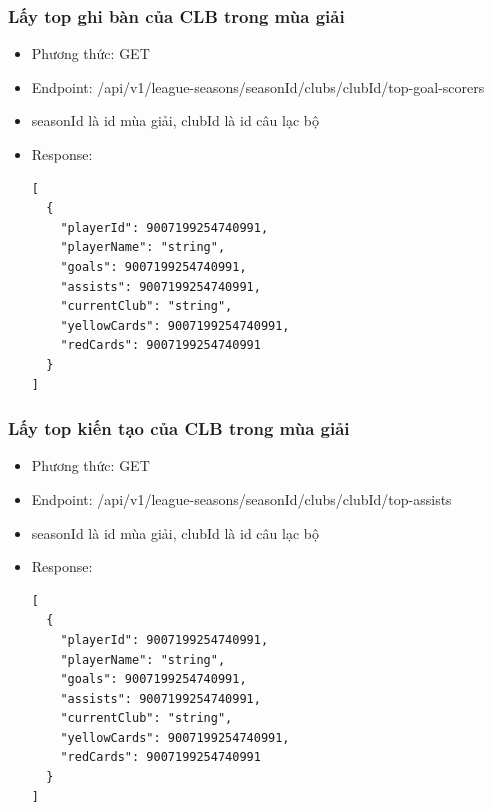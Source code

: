 \documentclass[../BTL.tex]{subfiles}
\begin{document}
\subsubsection{ Lấy top ghi bàn của CLB trong mùa giải}
\begin{itemize}
    \item Phương thức: GET
    \item Endpoint: /api/v1/league-seasons/{seasonId}/clubs/{clubId}/top-goal-scorers
    \item {seasonId} là id mùa giải, {clubId} là id câu lạc bộ
    \item Response:
        \begin{verbatim}
[
  {
    "playerId": 9007199254740991,
    "playerName": "string",
    "goals": 9007199254740991,
    "assists": 9007199254740991,
    "currentClub": "string",
    "yellowCards": 9007199254740991,
    "redCards": 9007199254740991
  }
]
        \end{verbatim}
\end{itemize}

\subsubsection{ Lấy top kiến tạo của CLB trong mùa giải}
\begin{itemize}
    \item Phương thức: GET
    \item Endpoint: /api/v1/league-seasons/{seasonId}/clubs/{clubId}/top-assists
    \item {seasonId} là id mùa giải, {clubId} là id câu lạc bộ
    \item Response:
        \begin{verbatim}
[
  {
    "playerId": 9007199254740991,
    "playerName": "string",
    "goals": 9007199254740991,
    "assists": 9007199254740991,
    "currentClub": "string",
    "yellowCards": 9007199254740991,
    "redCards": 9007199254740991
  }
]
        \end{verbatim}
\end{itemize}
\end{document}
